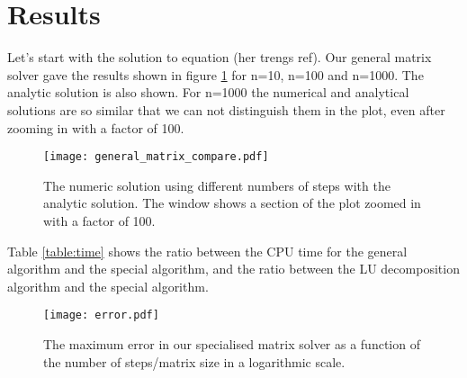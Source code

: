 \section{Results}
\label{sec:results}


%
%

Let's start with the solution to equation (her trengs ref). Our general matrix solver gave the results shown in figure \ref{fig:compare} for n=10, n=100 and n=1000. The analytic solution is also shown. For n=1000 the numerical and analytical solutions are so similar that we can not distinguish them in the plot, even after zooming in with a factor of 100. 
\begin{figure}[htbp]
	\centering
	\texttt{[image: general\_matrix\_compare.pdf]}
	\caption{The numeric solution using different numbers of steps with the analytic solution. The window shows a section of the plot zoomed in with a factor of 100.}
	\label{fig:compare}
\end{figure}

Table \ref{table:time} shows the ratio between the CPU time for the general algorithm and the special algorithm, and the ratio between the LU decomposition algorithm and the special algorithm.  

\begin{figure}[htbp]
	\centering
	\texttt{[image: error.pdf]}
	\caption{The maximum error in our specialised matrix solver as a function of the number of steps/matrix size in a logarithmic scale.}
	\label{fig:error}
\end{figure}

